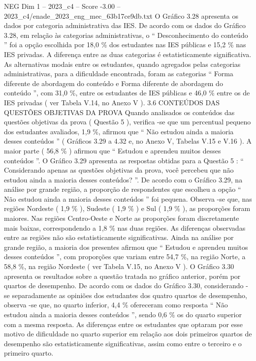 \begin{textsample}{NEG Dim 1 – 2023\_c4 – Score -3.00 – 2023\_c4/enade\_2023\_eng\_mec\_63b17ce9db.txt}
O Gráfico 3.28 apresenta os dados por categoria administrativa das IES.
De acordo com os dados do Gráfico 3.28, em relação às categorias administrativas, o “ Desconhecimento do conteúdo ” foi a opção escolhida por 18,0 \% dos estudantes nas IES públicas e 15,2 \% nas IES privadas.
A diferença entre as duas categorias é estatisticamente significativa.
As alternativas modais entre os estudantes, quando agregados pelas categorias administrativas, para a dificuldade encontrada, foram as categorias “ Forma diferente de abordagem do conteúdo e Forma diferente de abordagem do conteúdo ”, com 31,0 \%, entre os estudantes de IES públicas e 46,0 \% entre os de IES privadas ( ver Tabela V.14, no Anexo V ). 3.6 CONTEÚDOS DAS QUESTÕES OBJETIVAS DA PROVA Quando analisados os conteúdos das questões objetivas da prova ( Questão 5 ), verifica -se que um percentual pequeno dos estudantes avaliados, 1,9 \%, afirmou que “ Não estudou ainda a maioria desses conteúdos ” ( Gráficos 3.29 a 4.32 e, no Anexo V, Tabelas V.15 e V.16 ).
A maior parte ( 56,8 \% ) afirmou que “ Estudou e aprendeu muitos desses conteúdos ”.
O Gráfico 3.29 apresenta as respostas obtidas para a Questão 5 : “ Considerando apenas as questões objetivas da prova, você percebeu que não estudou ainda a maioria desses conteúdos? ”.
De acordo com o Gráfico 3.29, na análise por grande região, a proporção de respondentes que escolheu a opção “ Não estudou ainda a maioria desses conteúdos ” foi pequena.
Observa -se que, nas regiões Nordeste ( 1,9 \% ), Sudeste ( 1,9 \% ) e Sul ( 1,9 \% ), as proporções foram maiores.
Nas regiões Centro-Oeste e Norte as proporções foram discretamente mais baixas, correspondendo a 1,8 \% nas duas regiões.
As diferenças observadas entre as regiões não são estatisticamente significativas.
Ainda na análise por grande região, a maioria dos presentes afirmou que “ Estudou e aprendeu muitos desses conteúdos ”, com proporções que variam entre 54,7 \%, na região Norte, a 58,8 \%, na região Nordeste ( ver Tabela V.15, no Anexo V ).
O Gráfico 3.30 apresenta os resultados sobre a questão tratada no gráfico anterior, porém por quartos de desempenho.
De acordo com os dados do Gráfico 3.30, considerando -se separadamente as opiniões dos estudantes dos quatro quartos de desempenho, observa -se que, no quarto inferior, 4,4 \% ofereceram como resposta “ Não estudou ainda a maioria desses conteúdos ”, sendo 0,6 \% os do quarto superior com a mesma resposta.
As diferenças entre os estudantes que optaram por esse motivo de dificuldade no quarto superior em relação aos dois primeiros quartos de desempenho são estatisticamente significativas, assim como entre o terceiro e o primeiro quarto.

\end{textsample}

